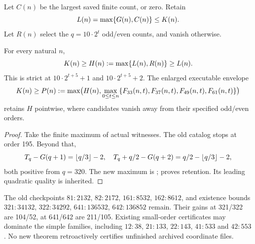 Let $C(n)$ be the largest saved finite count, or zero. Retain
\begin{equation}\label{j:envelope}
 L(n)=\max\{G(n),C(n)\}\le K(n).
\end{equation}
Let $R(n)$ select the $q=10\cdot2^t$ odd/even counts, and vanish otherwise.
\begin{theorem}\label{j:new-envelope}
For every natural $n$,
\begin{equation}\label{j:new-envelope-formula}
 K(n)\ge H(n):=\max\{L(n),R(n)\}\ge L(n).
\end{equation}
This is strict at $10\cdot2^{t+5}+1$ and $10\cdot2^{t+5}+2$. The enlarged executable envelope
\begin{equation}\label{j:portfolio}
 K(n)\ge P(n):=\max\bigl(H(n),\max_{0\le t\le n}
 \{F_{33}(n,t),F_{37}(n,t),F_{49}(n,t),F_{61}(n,t)\}\bigr)
\end{equation}
retains $H$ pointwise, where candidates vanish away from their specified odd/even orders.
\end{theorem}
\begin{proof}
Take the finite maximum of actual witnesses. The old catalog stops at order 195. Beyond that,
\begin{equation}\label{j:new-gains}
 T_q-G(q+1)=\left\lfloor q/3\right\rfloor-2,\quad
 T_q+q/2-G(q+2)=q/2-\left\lfloor q/3\right\rfloor-2,
\end{equation}
both positive from $q=320$. The new maximum is
;
proves retention. Its leading quadratic quality is inherited.
\end{proof}
The old checkpoints $81:2132$, $82:2172$, $161:8532$, $162:8612$, and existence bounds $321:34132$, $322:34292$, $641:136532$, $642:136852$ remain. Their gains at 321/322 are 104/52, at 641/642 are 211/105. Existing small-order certificates may dominate the simple families, including $12:38$, $21:133$, $22:143$, $41:533$ and $42:553$. No new theorem retroactively certifies unfinished archived coordinate files.
